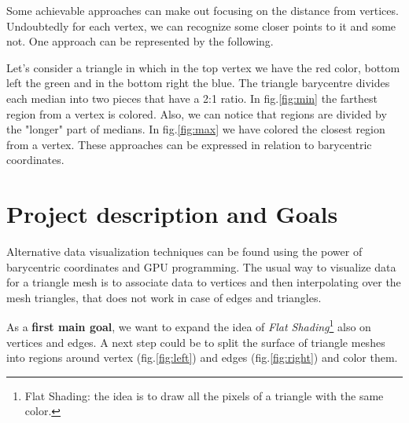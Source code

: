 \documentclass[11pt]{article}
\begin{document}
Some achievable approaches can make out focusing on the distance from vertices. Undoubtedly for each vertex, we can recognize some closer points to it and some not.
One approach can be represented by the following. 

Let's consider a triangle in which in the top vertex we have the red 
color, bottom left the green and in the bottom right the blue.
The triangle 
barycentre divides
each median into two pieces that have a 2:1 ratio.
In fig.\ref{fig:min} the farthest region from a vertex is colored. Also, we can notice that regions are divided by the "longer" part of medians.
In fig.\ref{fig:max} we have colored the closest region from a vertex. 
These approaches can be expressed in relation to barycentric coordinates.

\section{Project description and Goals}
Alternative data visualization techniques can be found using the power of barycentric coordinates and GPU programming.
The usual way to visualize data for a triangle mesh is to associate data 
to vertices and then interpolating over the mesh triangles, that does not work in case of edges and triangles. 


As a \textbf{first main goal}, we want to expand the idea of \textit{Flat Shading}\footnote{Flat Shading: the idea is to draw all the pixels
of a triangle with the same 
color.} also on vertices and edges. A next step could be to split the surface of triangle meshes into regions around vertex (fig.\ref{fig:left}) and edges (fig.\ref{fig:right}) and 
color them. 
\end{document}
